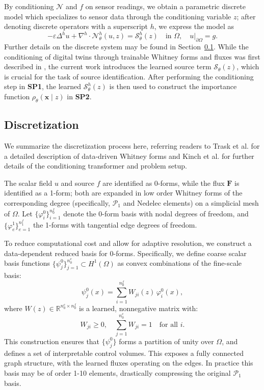 \documentclass[onefignum,onetabnum]{siamart171218} %
\begin{document}
By conditioning $\mathcal{N}$ and $f$ on sensor readings, we obtain a parametric discrete model which specializes to sensor data through the conditioning variable $z$; after denoting discrete operators with a superscript $h$, we express the model as
\begin{equation}
    \label{eq:learned-pde}
    -\varepsilon \Delta^h u + \nabla^h \cdot \mathcal{N}^h_\theta(u, z) = \mathcal{S}^h_\theta(z) \quad \text{in } \Omega, \quad u|_{\partial \Omega} = g.
\end{equation}
Further details on the discrete system may be found in Section~\ref{sec:methodology_discretization}. While the conditioning of digital twins through trainable Whitney forms and fluxes was first described in \cite{kinch2025structure}, the current work introduces the learned source term \( \mathcal{S}_\theta(z) \), which is crucial for the task of source identification. After performing the conditioning step in \textbf{SP1}, the learned $\mathcal{S}^h_\theta(z)$ is then used to construct the importance function $\rho_\theta(\mathbf{x} \mid z)$ in \textbf{SP2}.


\subsection{Discretization}
\label{sec:methodology_discretization}

We summarize the discretization process here, referring readers to Trask et al. \cite{trask2022enforcing} for a detailed description of data-driven Whitney forms and Kinch et al. \cite{kinch2025structure} for further details of the conditioning transformer and problem setup. 

The scalar field $u$ and source $f$ are identified as 0-forms, while the flux $\mathbf{F} $ is identified as a 1-form; both are expanded in low order Whitney forms of the corresponding degree (specifically, $\mathcal{P}_1$ and Nedelec elements) on a simplicial mesh of $\Omega$. Let $\{ \varphi_i^0 \}_{i=1}^{n_0^f}$ denote the 0-form basis with nodal degrees of freedom, and $\{ \varphi_e^1 \}_{e=1}^{n_1^f}$ the 1-forms with tangential edge degrees of freedom.

To reduce computational cost and allow for adaptive resolution, we construct a data-dependent reduced basis for 0-forms. Specifically, we define coarse scalar basis functions $\{ \psi_j^0 \}_{j=1}^{n_0^c} \subset H^1(\Omega)$ as convex combinations of the fine-scale basis:
\begin{equation}
    \psi_j^0(x) = \sum_{i=1}^{n_0^f} W_{ji}(z)\, \varphi_i^0(x),
\end{equation}
where $W(z) \in \mathbb{R}^{n_0^c \times n_0^f}$ is a learned, nonnegative matrix with:
\begin{equation}
    W_{ji} \geq 0, \quad \sum_{j=1}^{n_0^c} W_{ji} = 1 \quad \text{for all } i.
\end{equation}
This construction ensures that $\{ \psi_j^0 \}$ forms a partition of unity over $\Omega$, and defines a set of interpretable control volumes. This exposes a fully connected graph structure, with the learned fluxes operating on the edges. In practice this basis may be of order 1-10 elements, drastically compressing the original $\mathcal{P}_1$ basis.
\end{document}
